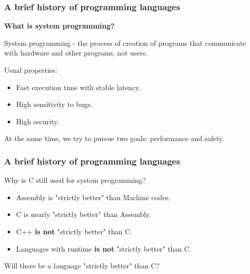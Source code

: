 \documentclass[aspectratio=1610,t]{beamer}
\begin{document}

\begin{frame}
\frametitle{A brief history of programming languages}
\textbf{What is system programming?}

System programming - the process of creation of programs that communicate with hardware and other programs, not users.

Usual properties:
\begin{itemize}
    \item Fast execution time with stable latency.
    \item High sensitivity to bugs.
    \item High security.
\end{itemize}

At the same time, we try to pursue two goals: performance and safety.
\end{frame}


\begin{frame}
\frametitle{A brief history of programming languages}
Why is C still used for system programming?

\begin{itemize}
    \item Assembly is "strictly better" than Machine codes.
    \item C is nearly "strictly better" than Assembly.
    \item C++ \textbf{is not} "strictly better" than C.
    \item Languages with runtime \textbf{is not} "strictly better" than C.
\end{itemize}

Will there be a language "strictly better" than C?
\end{frame}

\end{document}
